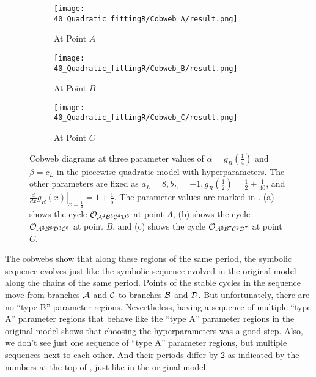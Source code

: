 \begin{figure}
	\centering
	\begin{subfigure}{0.3\textwidth}
		\centering
		\texttt{[image: 40\_Quadratic\_fittingR/Cobweb\_A/result.png]}
		\caption{At Point $A$}
		\label{fig:setup.quad.hyper.1.cobweb.A}
	\end{subfigure}
	\begin{subfigure}{0.3\textwidth}
		\centering
		\texttt{[image: 40\_Quadratic\_fittingR/Cobweb\_B/result.png]}
		\caption{At Point $B$}
		\label{fig:setup.quad.hyper.1.cobweb.B}
	\end{subfigure}
	\begin{subfigure}{0.3\textwidth}
		\centering
		\texttt{[image: 40\_Quadratic\_fittingR/Cobweb\_C/result.png]}
		\caption{At Point $C$}
		\label{fig:setup.quad.hyper.1.cobweb.C}
	\end{subfigure}
	\caption[Cobwebs of the first piecewise quadratic model with hyperparameters]{
	Cobweb diagrams at three parameter values of $\alpha = g_R\left(\frac{1}{4}\right)$ and $\beta = c_L$ in the piecewise quadratic model with hyperparameters.
	The other parameters are fixed as $a_L = 8, b_L = -1, g_R\left(\frac{1}{2}\right) = \frac{1}{2} + \frac{1}{40}$, and $\left. \frac{d}{dx} g_R(x) \right|_{x = \frac{1}{2}} = 1 + \frac{1}{5}$.
	The parameter values are marked in .
	(a) shows the cycle $\mathcal{O}_{\mathcal{A}^4\mathcal{B}^5\mathcal{C}^4\mathcal{D}^5}$ at point $A$, (b) shows the cycle $\mathcal{O}_{\mathcal{A}^3\mathcal{B}^6\mathcal{D}^3\mathcal{C}^6}$ at point $B$, and (c) shows the cycle $\mathcal{O}_{\mathcal{A}^2\mathcal{B}^7\mathcal{C}^2\mathcal{D}^7}$ at point $C$.
	}
	\label{fig:setup.quad.hyper.1.cobwebs}
\end{figure}


The cobwebs show that along these regions of the same period, the symbolic sequence evolves just like the symbolic sequence evolved in the original model along the chains of the same period.
Points of the stable cycles in the sequence move from branches $\mathcal{A}$ and $\mathcal{C}$ to branches $\mathcal{B}$ and $\mathcal{D}$.
But unfortunately, there are no ``type B'' parameter regions.
Nevertheless, having a sequence of multiple ``type A'' parameter regions that behave like the ``type A'' parameter regions in the original model shows that choosing the hyperparameters was a good step.
Also, we don't see just one sequence of ``type A'' parameter regions, but multiple sequences next to each other.
And their periods differ by 2 as indicated by the numbers at the top of , just like in the original model.
